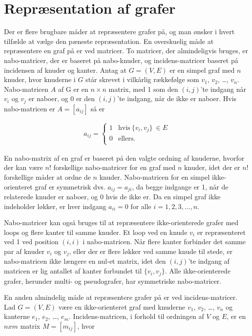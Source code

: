 \section{Repræsentation af grafer}
Der er flere brugbare måder at repræsentere grafer på, og man ønsker i hvert tilfælde at vælge den pæneste repræsentation. 
En overskuelig måde at repræsentere en graf på er ved matricer. To matricer, der almindeligvis bruges, er nabo-matricer, der er baseret på nabo-knuder, og incidens-matricer baseret på incidensen af knuder og kanter. 
Antag at $G=(V,E)$ er en simpel graf med $n$ knuder, hvor knuderne i $G$ står skrevet i vilkårlig rækkefølge som $v_1$, $v_2$, \dots , $v_n$.
Nabo-matricen $A$  af G er en $n \times n$ matrix, med 1 som den $(i,j)$’te indgang når $v_i$ og $v_j$ er naboer, og 0 er den $(i,j)$’te indgang, når de ikke er naboer. Hvis nabo-matricen er $A=[a_{ij}]$ så er

\begin{align*}
	a_{ij}= \left\{\begin{array}{cc}
	1 & \textrm{hvis} \  \lbrace v_i, v_j \rbrace \  \in E \\
	0 & \textrm{ellers} .\\
	\end{array}\right.
\end{align*}

En nabo-matrix af en graf er baseret på den valgte ordning af knuderne, hvorfor der kan være $n!$ forskellige nabo-matricer for en graf med $n$ knuder, idet der er $n!$ forskellige måder at ordne de $n$ knuder.
Nabo-matricen for en simpel ikke-orienteret graf er symmetrisk dvs.
$a_{ij}=a_{ji}$, da begge indgange er 1, når de relaterede knuder er naboer, og 0 hvis de ikke er.
Da en simpel graf ikke indeholder løkker, er hver indgang $a_{ii}=0$ for alle $i=1,2,3, \dots ,n$. 

Nabo-matricer kan også bruges til at repræsentere ikke-orienterede grafer med loops og flere kanter til samme knuder.
Et loop ved en knude $v_i$ er repræsenteret ved 1 ved position $(i,i)$ i nabo-matricen.
Når flere kanter forbinder det samme par af knuder $v_i$ og $v_j$, eller der er flere løkker ved samme knude til stede, er nabo-matricen ikke længere en nul-et matrix, idet den $(i,j)$’te indgang af matricen er lig antallet af kanter forbundet til $\lbrace v_i,v_j \rbrace$.
Alle ikke-orienterede grafer, herunder multi- og pseudografer, har symmetriske nabo-matricer.

En anden almindelig måde at repræsentere grafer på er ved incidens-matricer.
Lad $G=(V,E)$ være en ikke-orienteret graf med knuderne $v_1$, $v_2$, \dots , $v_n$ og kanterne $e_1$, $e_2$, \dots , $e_m$. Incidens-matricen, i forhold til ordningen af $V$ og $E$, er en $n x m$ matrix $M=[m_{ij}]$, hvor 

